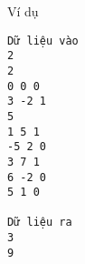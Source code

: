 Ví dụ
\begin{verbatim}
Dữ liệu vào
2
2
0 0 0
3 -2 1
5
1 5 1 
-5 2 0
3 7 1
6 -2 0 
5 1 0

Dữ liệu ra
3
9
\end{verbatim}